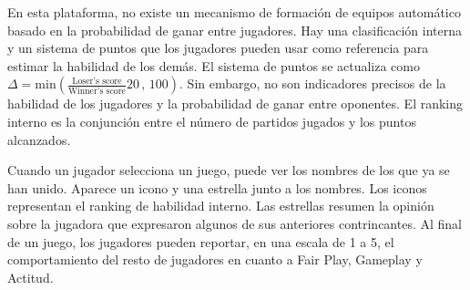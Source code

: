 \documentclass[a4paper,11pt]{book}
\theoremstyle{definition}
\begin{document}

En esta plataforma, no existe un mecanismo de formaci\'on de equipos autom\'atico basado en la probabilidad de ganar entre jugadores.
%
Hay una clasificaci\'on interna y un sistema de puntos que los jugadores pueden usar como referencia para estimar la habilidad de los dem\'as.
%
El sistema de puntos se actualiza como {\small $\Delta = \text{min}(\frac{\text{Loser's score}}{\text{Winner's score}}20\,,\,100 )$}.
%
Sin embargo, no son indicadores precisos de la habilidad de los jugadores y la probabilidad de ganar entre oponentes.
%
El ranking interno es la conjunci\'on entre el n\'umero de partidos jugados y los puntos alcanzados.


Cuando un jugador selecciona un juego, puede ver los nombres de los que ya se han unido.
%
Aparece un icono y una estrella junto a los nombres.
%
Los iconos representan el ranking de habilidad interno.
%
Las estrellas resumen la opini\'on sobre la jugadora que expresaron algunos de sus anteriores contrincantes.
%
Al final de un juego, los jugadores pueden reportar, en una escala de 1 a 5, el comportamiento del resto de jugadores en cuanto a Fair Play, Gameplay y Actitud.
%
\end{document}
